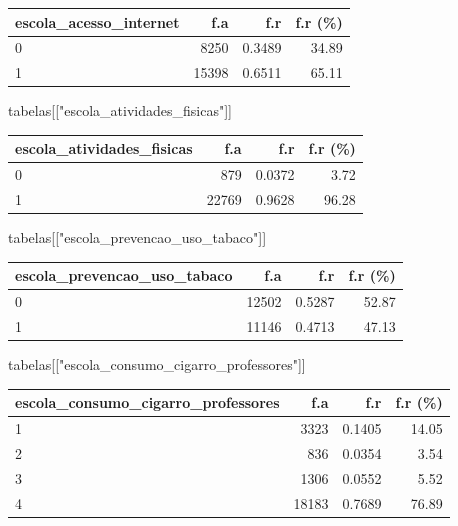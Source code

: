 \documentclass[
]{article}
\newenvironment{Shaded}{\begin{snugshade}}{\end{snugshade}}
\newcommand{\NormalTok}[1]{\textcolor[rgb]{0.00,0.23,0.31}{#1}}
\newcommand{\StringTok}[1]{\textcolor[rgb]{0.13,0.47,0.30}{#1}}
\begin{document}
\begin{longtable}[]{@{}lrrr@{}}
\toprule()
escola\_acesso\_internet & f.a & f.r & f.r (\%) \\
\midrule()
\endhead
0 & 8250 & 0.3489 & 34.89 \\
1 & 15398 & 0.6511 & 65.11 \\
\bottomrule()
\end{longtable}

\begin{Shaded}
\begin{Highlighting}[]
\NormalTok{tabelas[[}\StringTok{"escola\_atividades\_fisicas"}\NormalTok{]]}
\end{Highlighting}
\end{Shaded}

\begin{longtable}[]{@{}lrrr@{}}
\toprule()
escola\_atividades\_fisicas & f.a & f.r & f.r (\%) \\
\midrule()
\endhead
0 & 879 & 0.0372 & 3.72 \\
1 & 22769 & 0.9628 & 96.28 \\
\bottomrule()
\end{longtable}

\begin{Shaded}
\begin{Highlighting}[]
\NormalTok{tabelas[[}\StringTok{"escola\_prevencao\_uso\_tabaco"}\NormalTok{]]}
\end{Highlighting}
\end{Shaded}

\begin{longtable}[]{@{}lrrr@{}}
\toprule()
escola\_prevencao\_uso\_tabaco & f.a & f.r & f.r (\%) \\
\midrule()
\endhead
0 & 12502 & 0.5287 & 52.87 \\
1 & 11146 & 0.4713 & 47.13 \\
\bottomrule()
\end{longtable}

\begin{Shaded}
\begin{Highlighting}[]
\NormalTok{tabelas[[}\StringTok{"escola\_consumo\_cigarro\_professores"}\NormalTok{]]}
\end{Highlighting}
\end{Shaded}

\begin{longtable}[]{@{}lrrr@{}}
\toprule()
escola\_consumo\_cigarro\_professores & f.a & f.r & f.r (\%) \\
\midrule()
\endhead
1 & 3323 & 0.1405 & 14.05 \\
2 & 836 & 0.0354 & 3.54 \\
3 & 1306 & 0.0552 & 5.52 \\
4 & 18183 & 0.7689 & 76.89 \\
\bottomrule()
\end{longtable}
\end{document}
